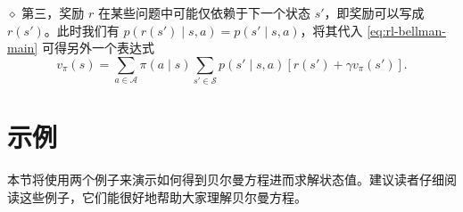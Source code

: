 \medskip
$\diamond$ 第三，奖励 $r$ 在某些问题中可能仅依赖于下一个状态 $s'$，即奖励可以写成 $r(s')$。此时我们有 $p(r(s') \mid s, a) = p(s' \mid s, a)$，将其代入 \cref{eq:rl-bellman-main} 可得另外一个表达式
\begin{equation*}
v_\pi(s) = \sum_{a \in \mathcal{A}} \pi(a \mid s) \sum_{s' \in \mathcal{S}} p(s' \mid s, a) \left[ r(s') + \gamma v_\pi(s') \right].
\end{equation*}

\section{示例}
\label{sec:rl-bellman-examples}

本节将使用两个例子来演示如何得到贝尔曼方程进而求解状态值。建议读者仔细阅读这些例子，它们能很好地帮助大家理解贝尔曼方程。

